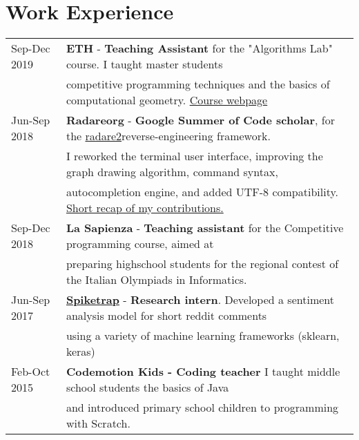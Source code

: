 \documentclass[a4paper,10pt]{article} %
\newcommand{\mh}[0]{{\hspace*{-1em}}}
\newcommand{\mH}[0]{{\hspace*{0.5em}}}
\newcommand{\spike}{\href{http://www.spiketrap.io/}{\textbf{Spiketrap}} }
\newcommand{\ra}{\href{https://gist.github.com/cyanpencil/27db326bf6f9d2747297fa9b943eb65b\#file-gsoc\_report\_final-md}{Short recap of my contributions. } }
\newcommand{\raa}{\href{http://beta.rada.re/en/latest/}{radare2}}
\begin{document}


\section{Work Experience}
\begin{tabular}{ll}
Sep-Dec 2019 \mH & \mh \textbf{ETH} - \textbf{Teaching Assistant} for the "Algorithms Lab" course. I taught master students \\ 
         & competitive programming techniques and the basics of computational geometry. \href{https://www.cadmo.ethz.ch/education/lectures/HS19/algolab/index.html}{Course webpage} \\
Jun-Sep 2018 & \mh \textbf{Radareorg} - \textbf{Google Summer of Code scholar}, for the \raa reverse-engineering framework.\\
     & I reworked the terminal user interface, improving the graph drawing algorithm, command syntax, \\
	 & autocompletion engine, and added UTF-8 compatibility. \ra  \\
Sep-Dec 2018 & \mh \textbf{La Sapienza} - \textbf{Teaching assistant} for the Competitive programming course, aimed at  \\ 
     & preparing highschool students for the regional contest of the Italian Olympiads in Informatics.  \\
Jun-Sep 2017 & \mh \spike - \textbf{Research intern}. Developed a sentiment analysis model for short reddit comments\\
	  & using a variety of machine learning frameworks (sklearn, keras) \\
Feb-Oct 2015 & \mh \textbf{Codemotion Kids - Coding teacher} I taught middle school students the basics of Java\\
     & and introduced primary school children to programming with Scratch.
\end{tabular}
\end{document}
